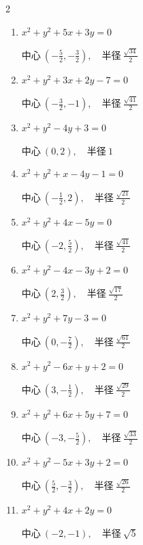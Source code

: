 \begin{multicols}{2}
\begin{enumerate}
  \item $x^{2}+y^{2}+5x+3y=0$

        $\displaystyle 中心\: \left(-\frac{5}{2},-\frac{3}{2}\right), \quad 半径 \ \frac{\sqrt{34}}{2}$

  \item $x^{2}+y^{2}+3x+2y-7=0$

        $\displaystyle 中心\: \left(-\frac{3}{2},-1\right), \quad 半径 \ \frac{\sqrt{41}}{2}$

  \item $x^{2}+y^{2}-4y+3=0$

        $\displaystyle 中心\: \left(0,2\right), \quad 半径 \ 1$

  \item $x^{2}+y^{2}+x-4y-1=0$

        $\displaystyle 中心\: \left(-\frac{1}{2},2\right), \quad 半径 \ \frac{\sqrt{21}}{2}$

  \item $x^{2}+y^{2}+4x-5y=0$

        $\displaystyle 中心\: \left(-2,\frac{5}{2}\right), \quad 半径 \ \frac{\sqrt{41}}{2}$

  \item $x^{2}+y^{2}-4x-3y+2=0$

        $\displaystyle 中心\: \left(2,\frac{3}{2}\right), \quad 半径 \ \frac{\sqrt{17}}{2}$

  \item $x^{2}+y^{2}+7y-3=0$

        $\displaystyle 中心\: \left(0,-\frac{7}{2}\right), \quad 半径 \ \frac{\sqrt{61}}{2}$

  \item $x^{2}+y^{2}-6x+y+2=0$

        $\displaystyle 中心\: \left(3,-\frac{1}{2}\right), \quad 半径 \ \frac{\sqrt{29}}{2}$

  \item $x^{2}+y^{2}+6x+5y+7=0$

        $\displaystyle 中心\: \left(-3,-\frac{5}{2}\right), \quad 半径 \ \frac{\sqrt{33}}{2}$

  \item $x^{2}+y^{2}-5x+3y+2=0$

        $\displaystyle 中心\: \left(\frac{5}{2},-\frac{3}{2}\right), \quad 半径 \ \frac{\sqrt{26}}{2}$

  \item $x^{2}+y^{2}+4x+2y=0$

        $\displaystyle 中心\: \left(-2,-1\right), \quad 半径 \ \sqrt{5}$


\end{enumerate}
\end{multicols}
